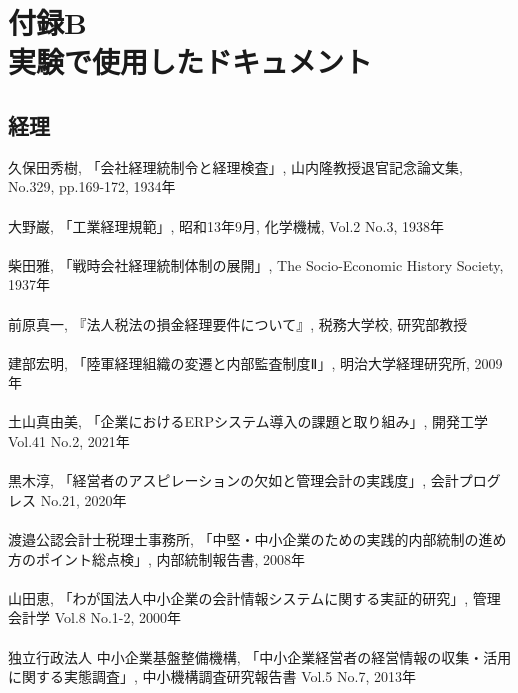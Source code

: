 \chapter*{付録B\\実験で使用したドキュメント}

\setlength{\parindent}{0pt}

\section*{経理}
久保田秀樹, 「会社経理統制令と経理検査」, 山内隆教授退官記念論文集, No.329, pp.169-172, 1934年
\\\\
大野巌, 「工業経理規範」, 昭和13年9月, 化学機械, Vol.2 No.3, 1938年
\\\\
柴田雅, 「戦時会社経理統制体制の展開」, The Socio-Economic History Society, 1937年
\\\\
前原真一, 『法人税法の損金経理要件について』, 税務大学校, 研究部教授
\\\\
建部宏明, 「陸軍経理組織の変遷と内部監査制度Ⅱ」, 明治大学経理研究所, 2009年
\\\\
土山真由美, 「企業におけるERPシステム導入の課題と取り組み」, 開発工学 Vol.41 No.2, 2021年
\\\\
黒木淳, 「経営者のアスピレーションの欠如と管理会計の実践度」, 会計プログレス No.21, 2020年
\\\\
渡邉公認会計士税理士事務所, 「中堅・中小企業のための実践的内部統制の進め方のポイント総点検」, 内部統制報告書, 2008年
\\\\
山田恵, 「わが国法人中小企業の会計情報システムに関する実証的研究」, 管理会計学 Vol.8 No.1-2, 2000年
\\\\
独立行政法人 中小企業基盤整備機構, 「中小企業経営者の経営情報の収集・活用に関する実態調査」, 中小機構調査研究報告書 Vol.5 No.7, 2013年

\clearpage
